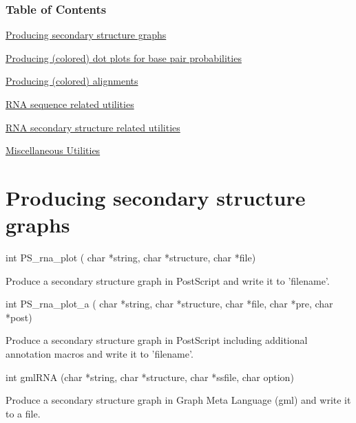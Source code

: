 \label{mp__utils_toc}
\hypertarget{mp__utils_toc}{}


\subsubsection*{Table of Contents}





\begin{DoxyItemize}
\item \hyperlink{mp__utils_utils_ss}{Producing secondary structure graphs} \item \hyperlink{mp__utils_utils_dot}{Producing (colored) dot plots for base pair probabilities} \item \hyperlink{mp__utils_utils_aln}{Producing (colored) alignments} \item \hyperlink{mp__utils_utils_seq}{RNA sequence related utilities} \item \hyperlink{mp__utils_utils_struc}{RNA secondary structure related utilities} \item \hyperlink{mp__utils_utils_misc}{Miscellaneous Utilities}\end{DoxyItemize}


\hypertarget{mp__utils_utils_ss}{}\section{Producing secondary structure graphs}\label{mp__utils_utils_ss}
\begin{DoxyVerb}
int PS_rna_plot ( char *string,
                  char *structure,
                  char *file)
\end{DoxyVerb}
 Produce a secondary structure graph in PostScript and write it to 'filename'. 

\begin{DoxyVerb}
int PS_rna_plot_a (
            char *string,
            char *structure,
            char *file,
            char *pre,
            char *post)
\end{DoxyVerb}
 Produce a secondary structure graph in PostScript including additional annotation macros and write it to 'filename'. 

\begin{DoxyVerb}
int gmlRNA (char *string,
            char *structure,
            char *ssfile,
            char option)
\end{DoxyVerb}
 Produce a secondary structure graph in Graph Meta Language (gml) and write it to a file. 

